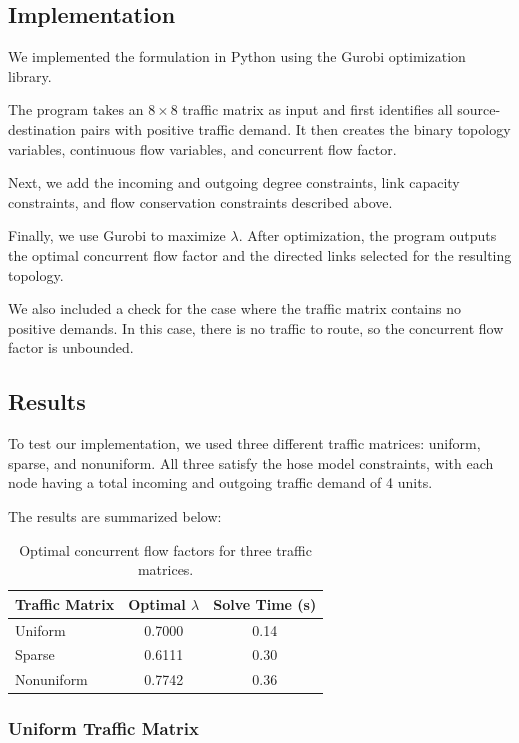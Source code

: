 \documentclass[11pt]{article}
\theoremstyle{definition}
\begin{document}
\subsection{Implementation}

We implemented the formulation in Python using the Gurobi optimization library.

The program takes an $8 \times 8$ traffic matrix as input and first identifies all source-destination pairs with positive traffic demand. It then creates the binary topology variables, continuous flow variables, and concurrent flow factor.

Next, we add the incoming and outgoing degree constraints, link capacity constraints, and flow conservation constraints described above.

Finally, we use Gurobi to maximize $\lambda$. After optimization, the program outputs the optimal concurrent flow factor and the directed links selected for the resulting topology.

We also included a check for the case where the traffic matrix contains no positive demands. In this case, there is no traffic to route, so the concurrent flow factor is unbounded.

\subsection{Results}

To test our implementation, we used three different traffic matrices: uniform, sparse, and nonuniform. All three satisfy the hose model constraints, with each node having a total incoming and outgoing traffic demand of 4 units.

The results are summarized below:

\begin{table}[h]
\centering
\begin{tabular}{lcc}
\toprule
\textbf{Traffic Matrix} & \textbf{Optimal $\lambda$} & \textbf{Solve Time (s)} \\
\midrule
Uniform & 0.7000 & 0.14 \\
Sparse & 0.6111 & 0.30 \\
Nonuniform & 0.7742 & 0.36 \\
\bottomrule
\end{tabular}
\caption{Optimal concurrent flow factors for three traffic matrices.}
\end{table}

\subsubsection{Uniform Traffic Matrix}
\end{document}
